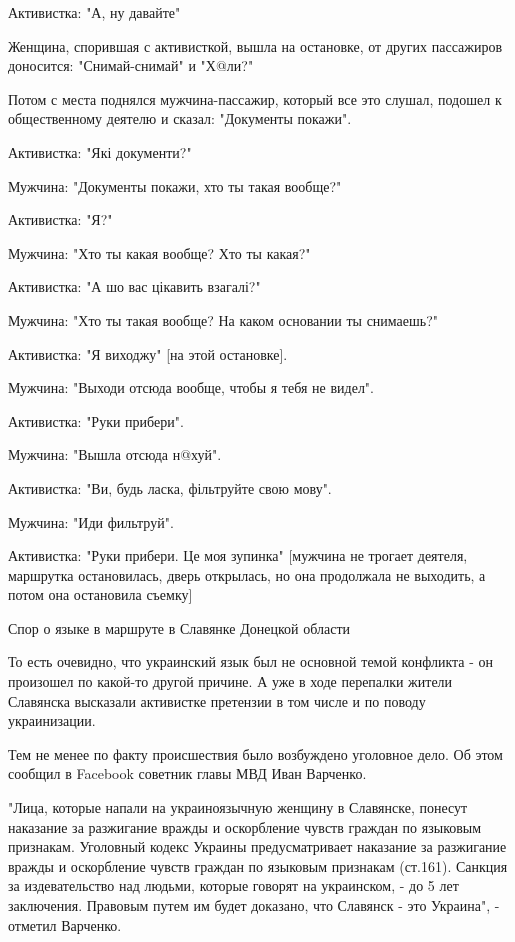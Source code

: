 Активистка: "А, ну давайте"

Женщина, спорившая с активисткой, вышла на остановке, от других пассажиров доносится: "Снимай-снимай" и "Х@ли?"  

Потом с места поднялся мужчина-пассажир, который все это слушал, подошел к общественному деятелю и сказал: "Документы покажи". 

Активистка: "Які документи?"

Мужчина: "Документы покажи, хто ты такая вообще?"

Активистка: "Я?"

Мужчина: "Хто ты какая вообще? Хто ты какая?"

Активистка: "А шо вас цікавить взагалі?"

Мужчина: "Хто ты такая вообще? На каком основании ты снимаешь?"

Активистка: "Я виходжу" [на этой остановке]. 

Мужчина: "Выходи отсюда вообще, чтобы я тебя не видел". 

Активистка: "Руки прибери". 

Мужчина: "Вышла отсюда н@хуй". 

Активистка: "Ви, будь ласка, фільтруйте свою мову". 

Мужчина: "Иди фильтруй". 

Активистка: "Руки прибери. Це моя зупинка" [мужчина не трогает деятеля, маршрутка остановилась, дверь открылась, но она продолжала не выходить, а потом она остановила съемку]

Спор о языке в маршруте в Славянке Донецкой области 

То есть очевидно, что украинский язык был не основной темой конфликта - он произошел по какой-то другой причине. А уже в ходе перепалки жители Славянска высказали активистке претензии в том числе и по поводу украинизации. 

Тем не менее по факту происшествия было возбуждено уголовное дело. Об этом сообщил в Facebook советник главы МВД Иван Варченко.

"Лица, которые напали на украиноязычную женщину в Славянске, понесут наказание за разжигание вражды и оскорбление чувств граждан по языковым признакам. Уголовный кодекс Украины предусматривает наказание за разжигание вражды и оскорбление чувств граждан по языковым признакам (ст.161). Санкция за издевательство над людьми, которые говорят на украинском, - до 5 лет заключения. Правовым путем им будет доказано, что Славянск - это Украина", - отметил Варченко. 

